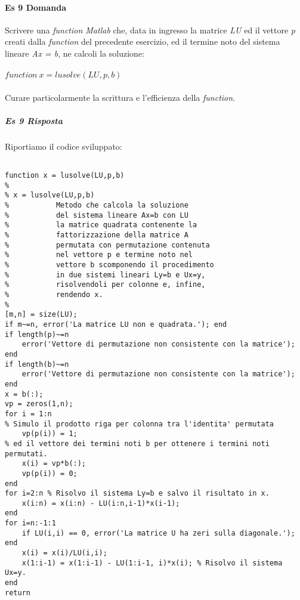 \documentclass[a4paper]{report}
\begin{document}
\paragraph{Es 9 Domanda}
Scrivere una \emph{function Matlab} che, data in ingresso la matrice \emph{LU} ed il vettore \emph{p} creati dalla \emph{function} del precedente esercizio, ed il termine noto del sistema lineare \emph{Ax = b}, ne calcoli la soluzione:
\\ \\$function \ x = lusolve(LU,p,b)$\\\\
Curare particolarmente la scrittura e l'efficienza della \emph{function}.
\subparagraph{Es 9 Risposta} Riportiamo il codice sviluppato:\\
\begin{lstlisting}

function x = lusolve(LU,p,b)
%
% x = lusolve(LU,p,b)
%           Metodo che calcola la soluzione 
%           del sistema lineare Ax=b con LU
%           la matrice quadrata contenente la 
%           fattorizzazione della matrice A
%           permutata con permutazione contenuta 
%           nel vettore p e termine noto nel
%           vettore b scomponendo il procedimento
%           in due sistemi lineari Ly=b e Ux=y,
%           risolvendoli per colonne e, infine, 
%           rendendo x.
%
[m,n] = size(LU); 
if m~=n, error('La matrice LU non e quadrata.'); end
if length(p)~=n
	error('Vettore di permutazione non consistente con la matrice'); end
if length(b)~=n
	error('Vettore di permutazione non consistente con la matrice'); end
x = b(:);
vp = zeros(1,n);
for i = 1:n
% Simulo il prodotto riga per colonna tra l'identita' permutata
	vp(p(i)) = 1;
% ed il vettore dei termini noti b per ottenere i termini noti permutati.
	x(i) = vp*b(:);
	vp(p(i)) = 0;
end
for i=2:n % Risolvo il sistema Ly=b e salvo il risultato in x.
	x(i:n) = x(i:n) - LU(i:n,i-1)*x(i-1);
end
for i=n:-1:1
	if LU(i,i) == 0, error('La matrice U ha zeri sulla diagonale.'); end
	x(i) = x(i)/LU(i,i); 
	x(1:i-1) = x(1:i-1) - LU(1:i-1, i)*x(i); % Risolvo il sistema Ux=y.
end
return
\end{lstlisting}
\newpage
\end{document}
